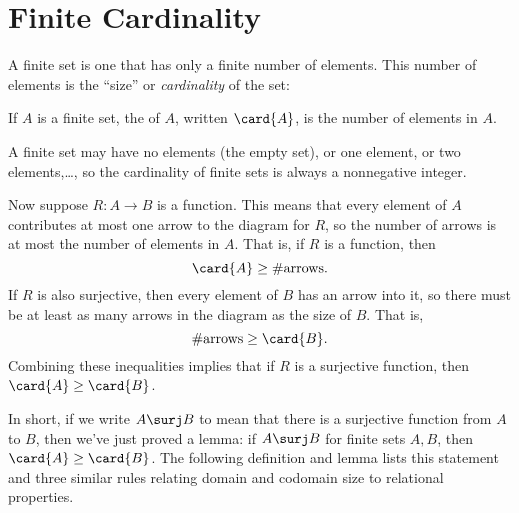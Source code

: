 \begin{problems}
\practiceproblems
{}

\classproblems
{}

\homeworkproblems

\examproblems
{}
\end{problems}


\section{Finite Cardinality}\label{mappingrule_sec}

A finite set is one that has only a finite number of elements.  This
number of elements is the ``size'' or \emph{cardinality} of the set:
\begin{definition}\label{fin_card_def}
If $A$ is a finite set, the  of $A$, written
$\card{A}$, is the number of elements in $A$.
\end{definition}
A finite set may have no elements (the empty set), or one element, or
two elements,\dots, so the cardinality of finite sets is always a
nonnegative integer.

Now suppose $R:A \to B$ is a function.  This means that every element
of $A$ contributes at most one arrow to the diagram for $R$, so the
number of arrows is at most the number of elements in $A$.  That is,
if $R$ is a function, then
\[
\card{A} \geq \#\text{arrows}.
\]
If $R$ is also surjective, then every element of $B$ has an arrow into
it, so there must be at least as many arrows in the diagram as the
size of $B$.  That is,
\[
\#\text{arrows} \geq \card{B}.
\]
Combining these inequalities implies that if $R$ is a surjective
function, then $\card{A} \geq \card{B}$.

In short, if we write $A \surj B$ to mean that there is a surjective
function from $A$ to $B$, then we've just proved a lemma: if $A \surj
B$ for finite sets $A,B$, then $\card{A} \geq \card{B}$.  The
following definition and lemma lists this statement and three similar
rules relating domain and codomain size to relational properties.

